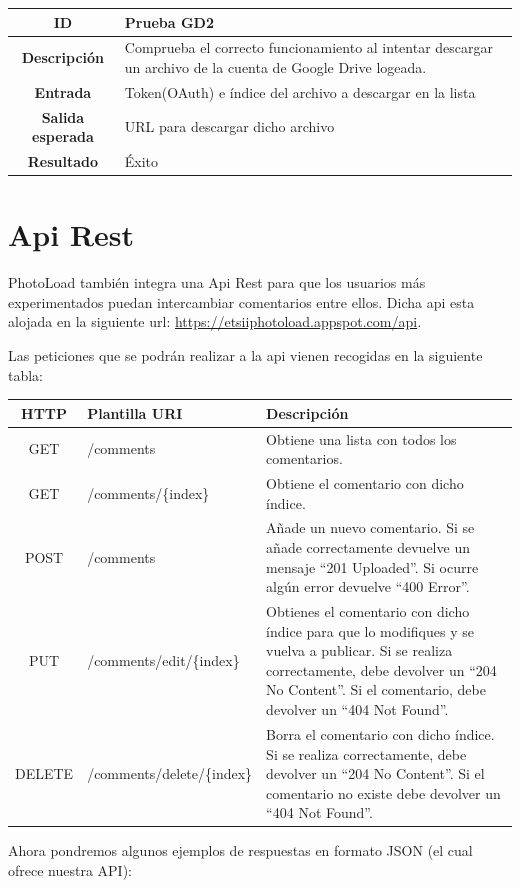 \documentclass{scrartcl}
\begin{document}
\begin{tabularx}{14cm}{|c|X|}
	\hline \textbf{ID} & Prueba GD2 \\ 
	\hline \textbf{Descripción} & Comprueba el correcto funcionamiento al intentar descargar un archivo de la cuenta de Google Drive logeada.\\	 
	\hline  \textbf{Entrada}		& Token(OAuth) e índice del archivo a descargar en la lista \\ 
	\hline  \textbf{Salida esperada}			& URL para descargar dicho archivo \\
	\hline  \textbf{Resultado}			& Éxito \\
	\hline 
\end{tabularx} 
\section{Api Rest}\label{cap:apiRest}
PhotoLoad también integra una Api Rest para que los usuarios más experimentados puedan intercambiar comentarios entre ellos. Dicha api esta alojada en la siguiente url: \href{https://etsiiphotoload.appspot.com/api}{https://etsiiphotoload.appspot.com/api}. 

Las peticiones que se podrán realizar a la api vienen recogidas en la siguiente tabla:
\\

\begin{tabularx}{14cm}{|c|X|X|}
	\hline \textbf{HTTP} & \textbf{Plantilla URI} &\textbf{Descripción}\\ 
	\hline GET & /comments & Obtiene una lista con todos los comentarios.\\	 
	\hline  GET		& /comments/\{index\}& Obtiene el comentario con dicho índice.\\ 
	\hline  POST			& /comments & Añade un nuevo comentario.
	Si se añade correctamente devuelve un mensaje “201 Uploaded”.
	Si ocurre algún error devuelve “400 Error”.\\
	\hline  PUT			& /comments/edit/\{index\}	& Obtienes el comentario con dicho índice para que lo modifiques y se vuelva a publicar.
	Si se realiza correctamente, debe devolver un “204 No Content”. Si el comentario, debe devolver un “404 Not Found”.\\
	\hline  DELETE			& /comments/delete/\{index\}	& Borra el comentario con dicho índice.
	Si se realiza correctamente, debe devolver un “204 No Content”. Si el comentario no existe debe devolver un “404 Not Found”.\\
	\hline 
\end{tabularx} 
\newpage
Ahora pondremos algunos ejemplos de respuestas en formato JSON (el cual ofrece nuestra API):
\\
\end{document}
